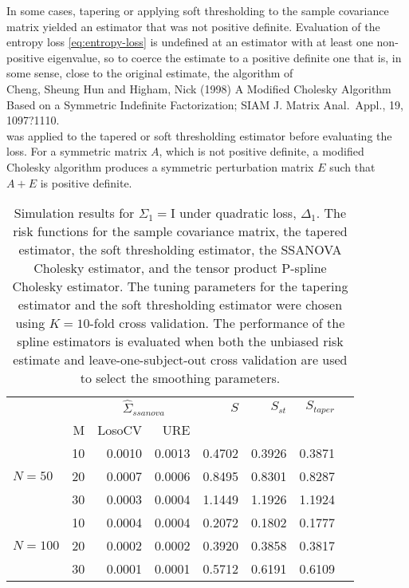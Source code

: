 \documentclass[12pt]{article}
\theoremstyle{definition}
\begin{document}
In some cases, tapering or applying soft thresholding to the sample covariance matrix yielded an estimator that was not positive definite. Evaluation of the entropy loss \ref{eq:entropy-loss} is undefined at an estimator with at least one non-positive eigenvalue, so to coerce the estimate to a positive definite one that is, in some sense, close to the original estimate, the algorithm of \\

Cheng, Sheung Hun and Higham, Nick (1998) A Modified Cholesky Algorithm Based on a Symmetric Indefinite Factorization; SIAM J. Matrix Anal.\ Appl., 19, 1097?1110. \\
\bigskip
was applied to the tapered or soft thresholding estimator before evaluating the loss. For a symmetric matrix $A$, which is not positive definite,  a modified Cholesky algorithm produces a symmetric perturbation matrix $E$ such that $A + E$ is positive definite.



\setlength{\dashlinedash}{0.5pt}
\setlength{\dashlinegap}{1pt}
\setlength{\arrayrulewidth}{0.2pt}

\begin{table}[ht]
\caption{Simulation results for $\Sigma_1 = \mathrm{I}$ under quadratic loss, $\Delta_1$. The risk functions for the sample covariance matrix, the tapered estimator, the soft thresholding estimator, the SSANOVA Cholesky estimator, and the tensor product P-spline Cholesky estimator. The tuning parameters for the tapering estimator and the soft thresholding estimator were chosen using $K = 10$-fold cross validation. The performance of the spline estimators is evaluated when both the unbiased risk estimate and leave-one-subject-out cross validation are used to select the smoothing parameters.}
\centering
\begin{tabular}{l|r|rrrrrr}
&  & \multicolumn{2}{c}{$\hat{\Sigma}_{ssanova}$} & $S$ & $S_{st}$ & $S_{taper}$ \\ 
&M & \mbox{LosoCV} & \mbox{URE} &  \\ 
\hline
		&    10 & 0.0010 & 0.0013 & 0.4702  & 0.3926 & 0.3871 \\ 
$N = 50$  &    20 & 0.0007 &  0.0006	& 0.8495 & 0.8301 & 0.8287 \\ 
  		&    30 & 0.0003 &  0.0004	& 1.1449 & 1.1926 & 1.1924  \\ \hdashline
		 &    10 & 0.0004 &  0.0004	& 0.2072 &  0.1802 & 0.1777\\ 
$N = 100$ &    20 & 0.0002 & 0.0002	& 0.3920  & 0.3858 & 0.3817 \\ 
   &    30 & 0.0001 & 0.0001 &0.5712 & 0.6191 & 0.6109 \\ 
\end{tabular}
\end{table}
\end{document}
